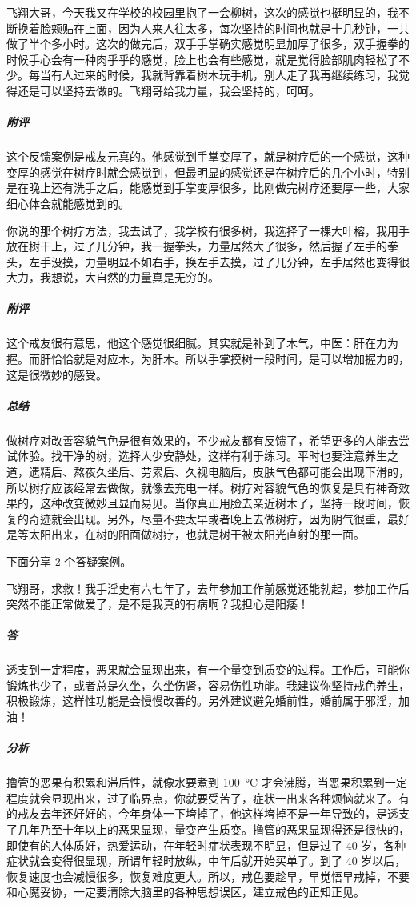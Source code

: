 \begin{case}
    飞翔大哥，今天我又在学校的校园里抱了一会柳树，这次的感觉也挺明显的，我不断换着脸颊贴在上面，因为人来人往太多，每次坚持的时间也就是十几秒钟，一共做了半个多小时。这次的做完后，双手手掌确实感觉明显加厚了很多，双手握拳的时候手心会有一种肉乎乎的感觉，脸上也会有些感觉，就是觉得脸部肌肉轻松了不少。每当有人过来的时候，我就背靠着树木玩手机，别人走了我再继续练习，我觉得还是可以坚持去做的。飞翔哥给我力量，我会坚持的，呵呵。

    \subparagraph{附评} 这个反馈案例是戒友元真的。他感觉到手掌变厚了，就是树疗后的一个感觉，这种变厚的感觉在树疗时就会感觉到，但最明显的感觉还是在树疗后的几个小时，特别是在晚上还有洗手之后，能感觉到手掌变厚很多，比刚做完树疗还要厚一些，大家细心体会就能感觉到的。
\end{case}

\begin{case}
    你说的那个树疗方法，我去试了，我学校有很多树，我选择了一棵大叶榕，我用手放在树干上，过了几分钟，我一握拳头，力量居然大了很多，然后握了左手的拳头，左手没摸，力量明显不如右手，换左手去摸，过了几分钟，左手居然也变得很大力，我想说，大自然的力量真是无穷的。

    \subparagraph{附评} 这个戒友很有意思，他这个感觉很细腻。其实就是补到了木气，中医：肝在力为握。而肝恰恰就是对应木，为肝木。所以手掌摸树一段时间，是可以增加握力的，这是很微妙的感受。
\end{case}

\subparagraph{总结} 做树疗对改善容貌气色是很有效果的，不少戒友都有反馈了，希望更多的人能去尝试体验。找干净的树，选择人少安静处，这样有利于练习。平时也要注意养生之道，遗精后、熬夜久坐后、劳累后、久视电脑后，皮肤气色都可能会出现下滑的，所以树疗应该经常去做做，就像去充电一样。树疗对容貌气色的恢复是具有神奇效果的，这种改变微妙且显而易见。当你真正用脸去亲近树木了，坚持一段时间，恢复的奇迹就会出现。另外，尽量不要太早或者晚上去做树疗，因为阴气很重，最好是等太阳出来，在树的阳面做树疗，也就是树干被太阳光直射的那一面。

下面分享 2 个答疑案例。

\begin{case}
    飞翔哥，求救！我手淫史有六七年了，去年参加工作前感觉还能勃起，参加工作后突然不能正常做爱了，是不是我真的有病啊？我担心是阳痿！
    \subparagraph{答} 透支到一定程度，恶果就会显现出来，有一个量变到质变的过程。工作后，可能你锻炼也少了，或者总是久坐，久坐伤肾，容易伤性功能。我建议你坚持戒色养生，积极锻炼，这样性功能是会慢慢改善的。另外建议避免婚前性，婚前属于邪淫，加油！
    \subparagraph{分析} 撸管的恶果有积累和滞后性，就像水要煮到 \SI{100}{\degreeCelsius} 才会沸腾，当恶果积累到一定程度就会显现出来，过了临界点，你就要受苦了，症状一出来各种烦恼就来了。有的戒友去年还好好的，今年身体一下垮掉了，他这样垮掉不是一年导致的，是透支了几年乃至十年以上的恶果显现，量变产生质变。撸管的恶果显现得还是很快的，即使有的人体质好，热爱运动，在年轻时症状表现不明显，但是过了 40 岁，各种症状就会变得很显现，所谓年轻时放纵，中年后就开始买单了。到了 40 岁以后，恢复速度也会减慢很多，恢复难度更大。所以，戒色要趁早，早觉悟早戒掉，不要和心魔妥协，一定要清除大脑里的各种思想误区，建立戒色的正知正见。
\end{case}

